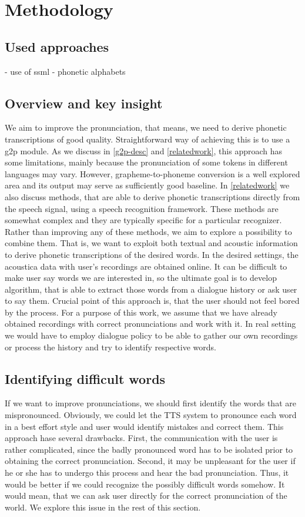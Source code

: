 \chapter{Methodology}
\section{Used approaches}
- use of ssml
- phonetic alphabets
\section{Overview and key insight}
We aim to improve the pronunciation, that means, we need to derive phonetic transcriptions of good quality. Straightforward way of achieving this is to use a g2p module. As we discuss in \ref{g2p-desc} and \ref{relatedwork}, this approach has some limitations, mainly because the pronunciation of some tokens in different languages may vary. However, grapheme-to-phoneme conversion is a well explored area and its output may serve as sufficiently good baseline. In \ref{relatedwork} we also discuss methods, that are able to derive phonetic transcriptions directly from the speech signal, using a speech recognition framework. These methods are somewhat complex and they are typically specific for a particular recognizer. Rather than improving any of these methods, we aim to explore a possibility to combine them. That is, we want to exploit both textual and acoustic information to derive phonetic transcriptions of the desired words.
\linebreak \linebreak
In the desired settings, the acoustica data with user's recordings are obtained online. It can be difficult to make user say words we are interested in, so the ultimate goal is to develop algorithm, that is able to extract those words from a dialogue history or ask user to say them. Crucial point of this approach is, that the user should not feel bored by the process. For a purpose of this work, we assume that we have already obtained recordings with correct pronunciations and work with it. In real setting we would have to employ dialogue policy to be able to gather our own recordings or process the history and try to identify respective words.

\section{Identifying difficult words}
If we want to improve pronunciations, we should first identify the words that are mispronounced. Obviously, we could let the TTS system to pronounce each word in a best effort style and user would identify mistakes and correct them. This approach hase several drawbacks. First, the communication with the user is rather complicated, since the badly pronounced word has to be isolated prior to obtaining the correct pronunciation. Second, it may be unpleasant for the user if he or she has to undergo this process and hear the bad pronunciation. Thus, it would be better if we could recognize the possibly difficult words somehow. It would mean, that we can ask user directly for the correct pronunciation of the world. We explore this issue in the rest of this section.
